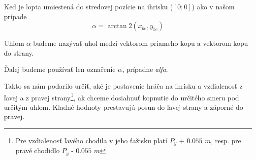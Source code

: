 Keď je lopta umiestená do stredovej pozície na ihrisku ($[0; 0]$) ako v našom prípade
$$\alpha = \arctan2(x_{be}, y_{be})$$

\begin{Definicia}
Uhlom $\alpha$ budeme nazývať uhol medzi vektorom priameho kopu a vektorom kopu do strany. 
\end{Definicia}
Ďalej budeme používať len označenie $\alpha$, prípadne \textit{alfa}.

Takto sa nám podarilo určiť, aké je postavenie hráča na ihrisku a vzdialenosť z ľavej a z pravej strany\footnote{Pre vzdialenosť ľavého chodila v jeho ťažisku platí $P_y$ + $0.055$ $m$, resp. pre pravé chodidlo  $P_y$ - $0.055$ $m$}, ak chceme dosiahnuť kopnutie do určitého smeru pod určitým uhlom. Kladné hodnoty prestavujú posun do ľavej strany a záporné do pravej.

